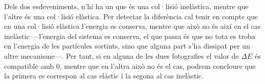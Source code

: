 \documentclass[12pt]{article}
\begin{document}
Dels dos esdeveniments, n'hi ha un que és una col·lisió inelàstica, mentre que l'altre és una col·lisió elàstica. Per detectar la diferència cal tenir en compte que en una col·lisió elàstica l'energia es conserva, mentre que això no és així en el cas inelàstic ---l'energia del sistema es conserva, el que passa és que no tota es troba en l'energia de les partícules sortints, sino que alguna part s'ha dissipat per un altre mecanisme---. Per tant, si en alguna de les dues fotografies el valor de \( \Delta E \) és compatible amb 0, mentre que en l'altra això no és el cas, podrem concloure que la primera es correspon al cas elàstic i la segona al cas inelàstic.
\end{document}
